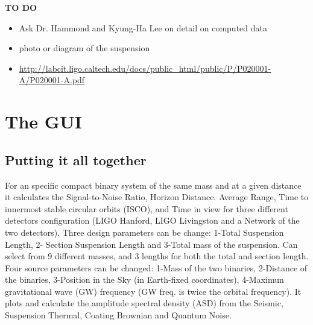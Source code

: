 \documentclass[11pt,fleqn]{book} %
\begin{document}
{\large \textbf{TO DO}}
\begin{itemize}
	\item Ask Dr. Hammond and Kyung-Ha Lee on detail on computed data
	\item photo or diagram of the suspension 
\end{itemize}

\begin{remark}
	\begin{itemize}
		\item \url{http://labcit.ligo.caltech.edu/docs/public_html/public/P/P020001-A/P020001-A.pdf}
	\end{itemize}
\end{remark}



\chapter{The GUI}

\section{Putting it all together}

For an specific compact binary system of the same mass and at a given distance it calculates the Signal-to-Noise Ratio, Horizon Distance. Average Range, Time to innermost stable circular orbits (ISCO), and Time in view for three different detectors configuration (LIGO Hanford, LIGO Livingston and a Network of the two detectors). Three design parameters can be change: 1-Total Suspension Length, 2- Section Suspension Length and 3-Total mass of the suspension. Can select from 9 different masses, and 3 lengths for both the total and section length. Four source parameters can be changed: 1-Mass of the two binaries, 2-Distance of the binaries, 3-Position in the Sky (in Earth-fixed coordinates), 4-Maximun gravitational wave (GW) frequency (GW freq. is twice the orbital frequency). It plots and calculate the amplitude spectral density (ASD) from the Seismic, Suspension Thermal, Coating Brownian and Quantum Noise.\\
\end{document}
